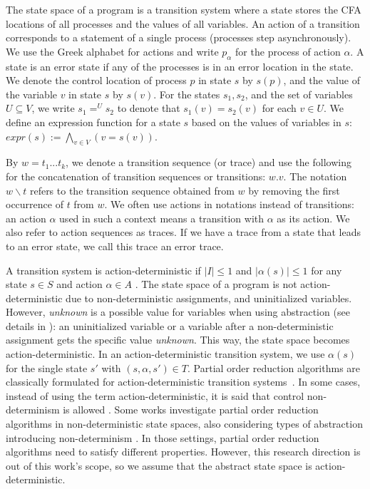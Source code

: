\documentclass[numbook]{svjour3}
\begin{document}
The state space of a program is a transition system where a state stores the CFA locations of all processes and the values of all variables. An action of a transition corresponds to a statement of a single process (processes step asynchronously). We use the Greek alphabet for actions and write $p_\alpha$ for the process of action $\alpha$. A state is an error state if any of the processes is in an error location in the state. We denote the control location of process $p$ in state $s$ by $s(p)$, and the value of the variable $v$ in state $s$ by $s(v)$. For the states $s_1, s_2$, and the set of variables $U \subseteq V$, we write $s_1 =^U s_2$ to denote that $s_1(v) = s_2(v)$ for each $v \in U$. We define an expression function for a state $s$ based on the values of variables in $s$: ${expr}(s) := \bigwedge_{v \in V} (v = s(v))$.

By $w = t_1...t_k$, we denote a transition sequence (or trace) and use the following for the concatenation of transition sequences or transitions: $w.v$. The notation $w \backslash t$ refers to the transition sequence obtained from $w$ by removing the first occurrence of $t$ from $w$. We often use actions in notations instead of transitions: an action $\alpha$ used in such a context means a transition with $\alpha$ as its action. We also refer to action sequences as traces. If we have a trace from a state that leads to an error state, we call this trace an error trace.

A transition system is action-deterministic if $|I| \le 1$ and $|\alpha(s)| \le 1$ for any state $s \in S$ and action $\alpha \in A$ \cite{principles-of-model-checking}. The state space of a program is not action-deterministic due to non-deterministic assignments, and uninitialized variables. However, \emph{unknown} is a possible value for variables when using abstraction (see details in ): an uninitialized variable or a variable after a non-deterministic assignment gets the specific value \emph{unknown}. This way, the state space becomes action-deterministic. In an action-deterministic transition system, we use $\alpha(s)$ for the single state $s'$ with $(s, \alpha, s') \in T$. Partial order reduction algorithms are classically formulated for action-deterministic transition systems~\cite{dpor,principles-of-model-checking,baelde-action-deterministic}. In some cases, instead of using the term action-deterministic, it is said that control non-determinism is allowed \cite{source_set_foundation}. Some works investigate partial order reduction algorithms in non-deterministic state spaces, also considering types of abstraction introducing non-determinism \cite{hansen_abstractions_por_nondet}. In those settings, partial order reduction algorithms need to satisfy different properties. However, this research direction is out of this work's scope, so we assume that the abstract state space is action-deterministic.
\end{document}
